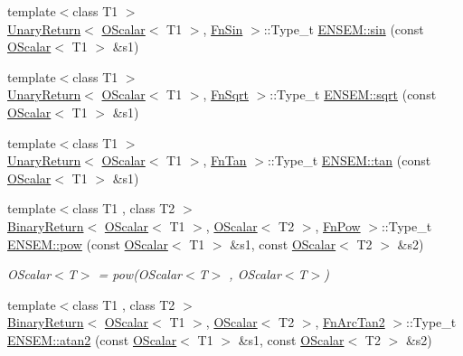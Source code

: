 \begin{DoxyCompactItemize}
\item 
{\footnotesize template$<$class T1 $>$ }\\\mbox{\hyperlink{structENSEM_1_1UnaryReturn}{Unary\+Return}}$<$ \mbox{\hyperlink{classENSEM_1_1OScalar}{O\+Scalar}}$<$ T1 $>$, \mbox{\hyperlink{structENSEM_1_1FnSin}{Fn\+Sin}} $>$\+::Type\+\_\+t \mbox{\hyperlink{group__obsscalar_ga2f881a4ba6a085af64243caa93001f49}{E\+N\+S\+E\+M\+::sin}} (const \mbox{\hyperlink{classENSEM_1_1OScalar}{O\+Scalar}}$<$ T1 $>$ \&s1)
\item 
{\footnotesize template$<$class T1 $>$ }\\\mbox{\hyperlink{structENSEM_1_1UnaryReturn}{Unary\+Return}}$<$ \mbox{\hyperlink{classENSEM_1_1OScalar}{O\+Scalar}}$<$ T1 $>$, \mbox{\hyperlink{structENSEM_1_1FnSqrt}{Fn\+Sqrt}} $>$\+::Type\+\_\+t \mbox{\hyperlink{group__obsscalar_ga8b8e13d0f31d513ae7c36827f65c0c61}{E\+N\+S\+E\+M\+::sqrt}} (const \mbox{\hyperlink{classENSEM_1_1OScalar}{O\+Scalar}}$<$ T1 $>$ \&s1)
\item 
{\footnotesize template$<$class T1 $>$ }\\\mbox{\hyperlink{structENSEM_1_1UnaryReturn}{Unary\+Return}}$<$ \mbox{\hyperlink{classENSEM_1_1OScalar}{O\+Scalar}}$<$ T1 $>$, \mbox{\hyperlink{structENSEM_1_1FnTan}{Fn\+Tan}} $>$\+::Type\+\_\+t \mbox{\hyperlink{group__obsscalar_ga9d270814e58292523d977713c693c876}{E\+N\+S\+E\+M\+::tan}} (const \mbox{\hyperlink{classENSEM_1_1OScalar}{O\+Scalar}}$<$ T1 $>$ \&s1)
\item 
{\footnotesize template$<$class T1 , class T2 $>$ }\\\mbox{\hyperlink{structENSEM_1_1BinaryReturn}{Binary\+Return}}$<$ \mbox{\hyperlink{classENSEM_1_1OScalar}{O\+Scalar}}$<$ T1 $>$, \mbox{\hyperlink{classENSEM_1_1OScalar}{O\+Scalar}}$<$ T2 $>$, \mbox{\hyperlink{structENSEM_1_1FnPow}{Fn\+Pow}} $>$\+::Type\+\_\+t \mbox{\hyperlink{group__obsscalar_ga9cb05cc2982ed462255669689f38c8cd}{E\+N\+S\+E\+M\+::pow}} (const \mbox{\hyperlink{classENSEM_1_1OScalar}{O\+Scalar}}$<$ T1 $>$ \&s1, const \mbox{\hyperlink{classENSEM_1_1OScalar}{O\+Scalar}}$<$ T2 $>$ \&s2)
\begin{DoxyCompactList}\small\item\em O\+Scalar$<$\+T$>$ = pow(\+O\+Scalar$<$\+T$>$ , O\+Scalar$<$\+T$>$) \end{DoxyCompactList}\item 
{\footnotesize template$<$class T1 , class T2 $>$ }\\\mbox{\hyperlink{structENSEM_1_1BinaryReturn}{Binary\+Return}}$<$ \mbox{\hyperlink{classENSEM_1_1OScalar}{O\+Scalar}}$<$ T1 $>$, \mbox{\hyperlink{classENSEM_1_1OScalar}{O\+Scalar}}$<$ T2 $>$, \mbox{\hyperlink{structENSEM_1_1FnArcTan2}{Fn\+Arc\+Tan2}} $>$\+::Type\+\_\+t \mbox{\hyperlink{group__obsscalar_gaa28e2966b2f7ca96382766631b1e7bd1}{E\+N\+S\+E\+M\+::atan2}} (const \mbox{\hyperlink{classENSEM_1_1OScalar}{O\+Scalar}}$<$ T1 $>$ \&s1, const \mbox{\hyperlink{classENSEM_1_1OScalar}{O\+Scalar}}$<$ T2 $>$ \&s2)

\end{DoxyCompactItemize}
